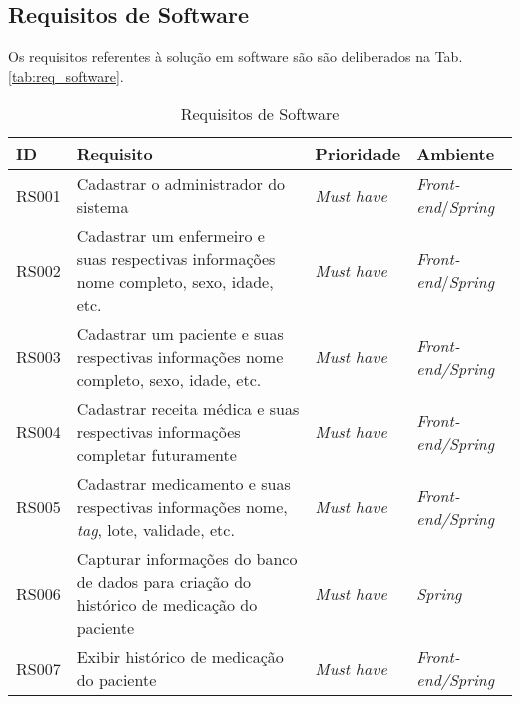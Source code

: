 \newpage
\subsection{Requisitos de Software}
Os requisitos referentes à solução em software são são deliberados na Tab. \ref{tab:req_software}.

\begin{table}[H]
    \centering
    \caption{Requisitos de Software}
	\begin{adjustbox}{max width = \textwidth}
        \begin{tabular}{|L{1.5cm}|L{8.5cm}|C{2.5cm}|C{3.5cm}|}
        \hline
        \textbf{ID} & \textbf{Requisito} & \textbf{Prioridade} & \textbf{Ambiente} \\
        \hline
        RS001 & Cadastrar o administrador do sistema & \textit{Must have}& \textit{Front-end}/\textit{Spring}\\ 
        \hline
        RS002 & Cadastrar um enfermeiro e suas respectivas informações {nome completo, sexo, idade, etc.} & \textit{Must have} & \textit{Front-end}/\textit{Spring} \\
        \hline
        RS003 & Cadastrar um paciente e suas respectivas informações {nome completo, sexo, idade, etc.} & \textit{Must have} & \textit{Front-end/Spring} \\ 
        \hline
        RS004 & Cadastrar receita médica e suas respectivas informações {completar futuramente} & \textit{Must have} & \textit{Front-end/Spring} \\ 
        \hline
        RS005 & Cadastrar medicamento e suas respectivas informações {nome, \textit{tag}, lote, validade, etc.} & \textit{Must have} & \textit{Front-end/Spring} \\ 
        \hline
        RS006 & Capturar informações do banco de dados para criação do histórico de medicação do paciente & \textit{Must have} & \textit{Spring} \\
        \hline
        RS007 & Exibir histórico de medicação do paciente & \textit{Must have} & \textit{Front-end/Spring} \\

\end{tabular}
\end{adjustbox}
\end{table}
